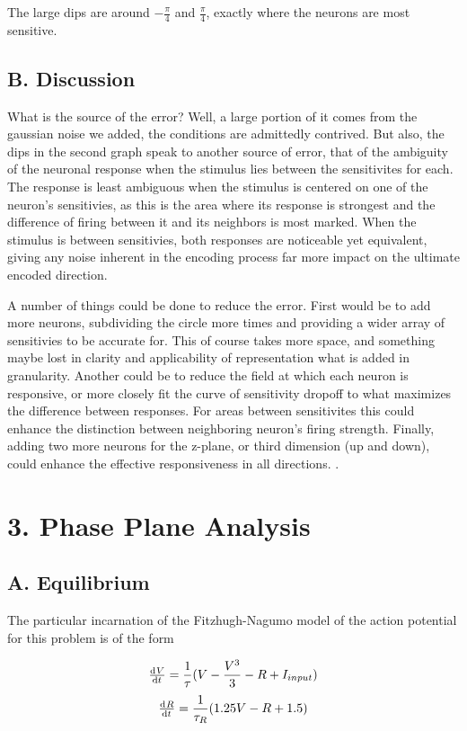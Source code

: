 \documentclass[12pt]{article}
\begin{document}
The large dips are around $-\frac{\pi}{4}$ and $\frac{\pi}{4}$, exactly where the neurons are most sensitive.  

\subsection{B. Discussion}

What is the source of the error?  Well, a large portion of it comes from the gaussian noise we added, the conditions are admittedly contrived.  But also, the dips in the second graph speak to another source of error, that of the ambiguity of the neuronal response when the stimulus lies between the sensitivites for each.  The response is least ambiguous when the stimulus is centered on one of the neuron's sensitivies, as this is the area where its response is strongest and the difference of firing between it and its neighbors is most marked.  When the stimulus is between sensitivies, both responses are noticeable yet equivalent, giving any noise inherent in the encoding process far more impact on the ultimate encoded direction.  

A number of things could be done to reduce the error.  First would be to add more neurons, subdividing the circle more times and providing a wider array of sensitivies to be accurate for.  This of course takes more space, and something maybe lost in clarity and applicability of representation what is added in granularity.  Another could be to reduce the field at which each neuron is responsive, or more closely fit the curve of sensitivity dropoff to what maximizes the difference between responses.  For areas between sensitivites this could enhance the distinction between neighboring neuron's firing strength.  Finally, adding two more neurons for the z-plane, or third dimension (up and down), could enhance the effective responsiveness in all directions.   .

\section{3. Phase Plane Analysis}

\subsection{A. Equilibrium}

The particular incarnation of the Fitzhugh-Nagumo model of the action potential for this problem is of the form

$$ \od{V}{t}=\frac{1}{\tau}(V-\frac{V^3}{3}-R+I_{input}) $$
$$ \od{R}{t}=\frac{1}{\tau_R}(1.25V-R+1.5) $$
\end{document}
